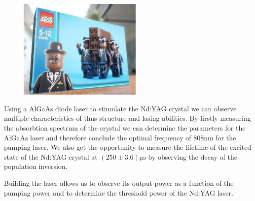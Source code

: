 \documentclass[../main.tex]{subfiles}
\begin{document}
\begin{figure}[H]
    \centering
    \includegraphics[width=6cm]{Bilddateien/CoffinDance.jpg}
    \label{fig:myfreshbild}
\end{figure}

Using a AlGaAs diode laser to stimulate the Nd:YAG crystal we can observe multiple characteristics of thus structure and lasing abilities. By firstly measuring the absorbtion spectrum of the crystal we can determine the parameters for the AlGaAs laser and therefore conclude the optimal frequency of $808\si{\nm}$ for the pumping laser. We also get the opportunity to measure the lifetime of the excited state of the Nd:YAG crystal at $(250\pm 3.6)\si{\micro\s}$ by observing the decay of the population inversion.

Building the laser allows us to observe its output power as a function of the pumping power and to determine the threshold power of the Nd:YAG laser. 
\end{document}
